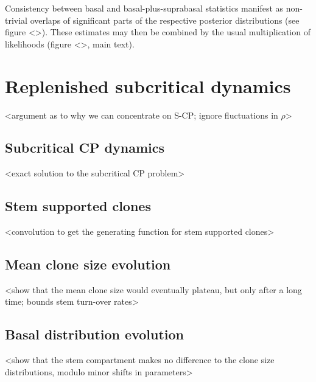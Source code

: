 \documentclass[10pt,UKenglish]{article}
\begin{document}
Consistency between basal and basal-plus-suprabasal statistics manifest as non-trivial overlaps of significant parts of the respective posterior distributions (see figure <>). These estimates may then be combined by the usual multiplication of likelihoods (figure <>, main text).

\section{Replenished subcritical dynamics}

<argument as to why we can concentrate on S-CP; ignore fluctuations in $\rho$>

\subsection{Subcritical CP dynamics}

<exact solution to the subcritical CP problem>

\subsection{Stem supported clones}

<convolution to get the generating function for stem supported clones>

\subsection{Mean clone size evolution}

<show that the mean clone size would eventually plateau, but only after a long time; bounds stem turn-over rates>

\subsection{Basal distribution evolution}

<show that the stem compartment makes no difference to the clone size distributions, modulo minor shifts in parameters>
\end{document}
